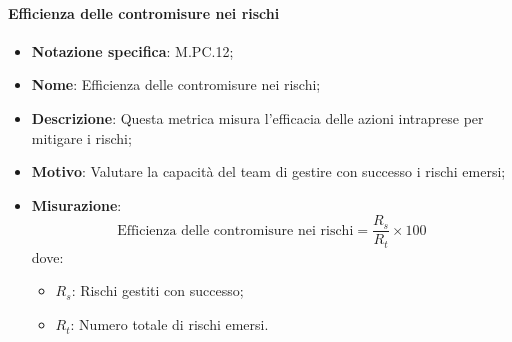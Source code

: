 \paragraph*{Efficienza delle contromisure nei rischi}
\begin{itemize}
    \item \textbf{Notazione specifica}: M.PC.12;
    \item \textbf{Nome}: Efficienza delle contromisure nei rischi;
    \item \textbf{Descrizione}: Questa metrica misura l'efficacia delle azioni intraprese per mitigare i rischi;
    \item \textbf{Motivo}: Valutare la capacità del team di gestire con successo i rischi emersi;
    \item \textbf{Misurazione}:
    \[
        \text{Efficienza delle contromisure nei rischi} = \frac{R_s}{R_t} \times 100
    \]
    dove:
    \begin{itemize}
        \item $R_{s}$: Rischi gestiti con successo;
        \item $R_{t}$: Numero totale di rischi emersi.
    \end{itemize}
\end{itemize}